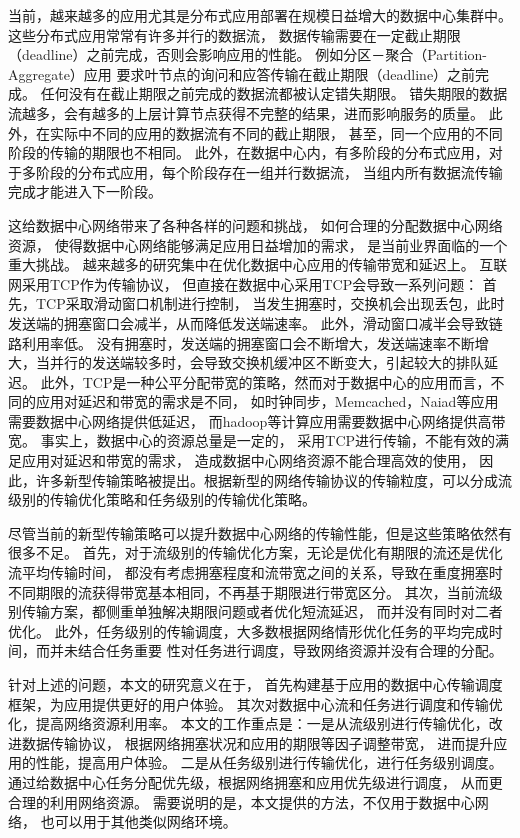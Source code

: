 当前，越来越多的应用尤其是分布式应用部署在规模日益增大的数据中心集群中。
这些分布式应用常常有许多并行的数据流，
数据传输需要在一定截止期限（deadline）之前完成，否则会影响应用的性能。
例如分区－聚合（Partition-Aggregate）应用
要求叶节点的询问和应答传输在截止期限（deadline）之前完成。
任何没有在截止期限之前完成的数据流都被认定错失期限。
错失期限的数据流越多，会有越多的上层计算节点获得不完整的结果，进而影响服务的质量。
此外，在实际中不同的应用的数据流有不同的截止期限，
甚至，同一个应用的不同阶段的传输的期限也不相同。
此外，在数据中心内，有多阶段的分布式应用，对于多阶段的分布式应用，每个阶段存在一组并行数据流，
当组内所有数据流传输完成才能进入下一阶段。




这给数据中心网络带来了各种各样的问题和挑战，
如何合理的分配数据中心网络资源，
使得数据中心网络能够满足应用日益增加的需求，
是当前业界面临的一个重大挑战。
越来越多的研究集中在优化数据中心应用的传输带宽和延迟上。
互联网采用TCP作为传输协议，
但直接在数据中心采用TCP会导致一系列问题：
首先，TCP采取滑动窗口机制进行控制，
当发生拥塞时，交换机会出现丢包，此时发送端的拥塞窗口会减半，从而降低发送端速率。
此外，滑动窗口减半会导致链路利用率低。
没有拥塞时，发送端的拥塞窗口会不断增大，发送端速率不断增大，当并行的发送端较多时，会导致交换机缓冲区不断变大，引起较大的排队延迟。
此外，TCP是一种公平分配带宽的策略，然而对于数据中心的应用而言，不同的应用对延迟和带宽的需求是不同，
如时钟同步，Memcached，Naiad等应用需要数据中心网络提供低延迟，
而hadoop等计算应用需要数据中心网络提供高带宽。
事实上，数据中心的资源总量是一定的，
采用TCP进行传输，不能有效的满足应用对延迟和带宽的需求，
造成数据中心网络资源不能合理高效的使用，
因此，许多新型传输策略被提出。根据新型的网络传输协议的传输粒度，可以分成流级别的传输优化策略和任务级别的传输优化策略。


尽管当前的新型传输策略可以提升数据中心网络的传输性能，但是这些策略依然有很多不足。
首先，对于流级别的传输优化方案，无论是优化有期限的流还是优化流平均传输时间，
都没有考虑拥塞程度和流带宽之间的关系，导致在重度拥塞时不同期限的流获得带宽基本相同，不再基于期限进行带宽区分。
其次，当前流级别传输方案，都侧重单独解决期限问题或者优化短流延迟，
而并没有同时对二者优化。
此外，任务级别的传输调度，大多数根据网络情形优化任务的平均完成时间，而并未结合任务重要
性对任务进行调度，导致网络资源并没有合理的分配。


针对上述的问题，本文的研究意义在于，
首先构建基于应用的数据中心传输调度框架，为应用提供更好的用户体验。
其次对数据中心流和任务进行调度和传输优化，提高网络资源利用率。
本文的工作重点是：一是从流级别进行传输优化，改进数据传输协议，
根据网络拥塞状况和应用的期限等因子调整带宽，
进而提升应用的性能，提高用户体验。
二是从任务级别进行传输优化，进行任务级别调度。
通过给数据中心任务分配优先级，根据网络拥塞和应用优先级进行调度，
从而更合理的利用网络资源。
需要说明的是，本文提供的方法，不仅用于数据中心网络，
也可以用于其他类似网络环境。

